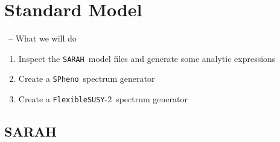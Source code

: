 \documentclass[11pt]{beamer}
\newcommand{\FlexibleSUSY}{\texttt{FlexibleSUSY}}
\newcommand{\hc}{\text{h.c.}}
\newcommand{\Lagrin}{\mathcal{L}_{\text{int}}}
\newcommand{\SARAH}{\texttt{SARAH}}
\newcommand{\SPheno}{\texttt{SPheno}}
\begin{document}




\section{Standard Model}



\begin{frame}[fragile]{\insertsection\ -- What we will do}
  \begin{enumerate}
  \item Inspect the \SARAH\ model files and generate some analytic
    expressions
  \item Create a \SPheno\ spectrum generator 
  \item Create a \FlexibleSUSY-2\ spectrum generator 
  \end{enumerate}
\end{frame}


\subsection{SARAH}
\end{document}
